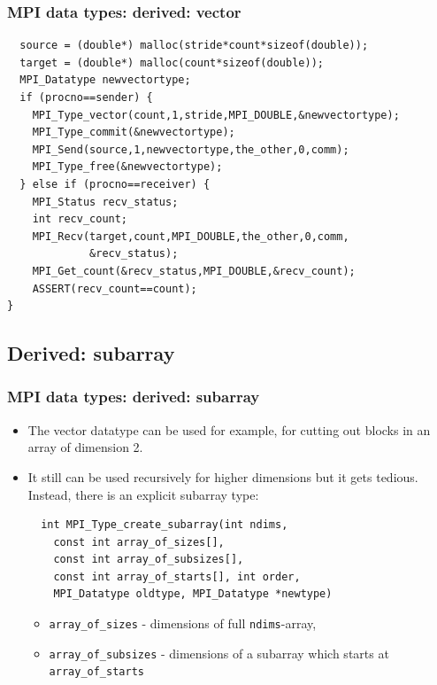 \documentclass{beamer}
\begin{document}
\begin{frame}[fragile]
  \frametitle{MPI data types: derived: vector}
{\color{mycolorcode}
\begin{verbatim}
  source = (double*) malloc(stride*count*sizeof(double));
  target = (double*) malloc(count*sizeof(double));
  MPI_Datatype newvectortype;
  if (procno==sender) {
    MPI_Type_vector(count,1,stride,MPI_DOUBLE,&newvectortype);
    MPI_Type_commit(&newvectortype);
    MPI_Send(source,1,newvectortype,the_other,0,comm);
    MPI_Type_free(&newvectortype);
  } else if (procno==receiver) {
    MPI_Status recv_status;
    int recv_count;
    MPI_Recv(target,count,MPI_DOUBLE,the_other,0,comm,
             &recv_status);
    MPI_Get_count(&recv_status,MPI_DOUBLE,&recv_count);
    ASSERT(recv_count==count);
}
\end{verbatim}
}
\end{frame}


\subsection{Derived: subarray}
\begin{frame}[fragile]
  \frametitle{MPI data types: derived: subarray}
\begin{itemize}
\item The vector datatype can be used for example, for cutting out blocks in an array of dimension 2. 
\item It still can be used recursively for higher dimensions but it gets tedious. Instead, there is an explicit subarray type:
{\color{mycolorcode}
\begin{verbatim}
  int MPI_Type_create_subarray(int ndims, 
    const int array_of_sizes[],
    const int array_of_subsizes[], 
    const int array_of_starts[], int order, 
    MPI_Datatype oldtype, MPI_Datatype *newtype)
\end{verbatim}
}
\begin{itemize}
\item {\color{mycolorcode}\verb|array_of_sizes|} - dimensions of full {\color{mycolorcode}\verb|ndims|}-array, 
\item {\color{mycolorcode}\verb|array_of_subsizes|} - dimensions of a subarray which starts at {\color{mycolorcode}\verb|array_of_starts|}
\end{itemize}
\end{itemize}
\end{frame}
\end{document}
